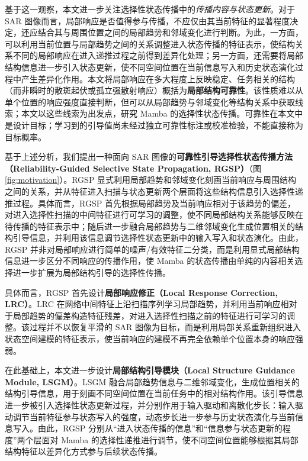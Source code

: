 \documentclass[journal]{IEEEtran}
\begin{document}
基于这一观察，本文进一步关注选择性状态传播中的\emph{传播内容与状态更新}。对于 SAR 图像而言，局部响应是否值得参与传播，不应仅由其当前特征的显著程度决定，还应结合其与周围位置之间的局部趋势和邻域变化进行判断。为此，一方面，可以利用当前位置与局部趋势之间的关系调整进入状态传播的特征表示，使结构关系不同的局部响应在进入递推过程之前得到差异化处理；另一方面，还需要将局部结构信息进一步引入状态更新，使不同空间位置在当前信息写入和历史状态演化过程中产生差异化作用。本文将局部响应在多大程度上反映稳定、任务相关的结构（而非瞬时的散斑起伏或孤立强散射响应）概括为\textbf{局部结构可靠性}。该性质难以从单个位置的响应强度直接判断，但可以从局部趋势与邻域变化等结构关系中获取线索；本文以这些线索为出发点，研究 Mamba 的选择性状态传播。可靠性在本文中是设计目标；学习到的引导值尚未经过独立可靠性标注或校准检验，不能直接称为目标概率。

基于上述分析，我们提出一种面向 SAR 图像的\textbf{可靠性引导选择性状态传播方法（Reliability-Guided Selective State Propagation, RGSP）}（图\ref{fig:motivation}）。RGSP 显式利用局部趋势和邻域变化刻画当前响应与周围结构之间的关系，并从特征进入扫描与状态更新两个层面将这些结构信息引入选择性递推过程。具体而言，RGSP 首先根据局部趋势及当前响应相对于该趋势的偏差，对进入选择性扫描的中间特征进行可学习的调整，使不同局部结构关系能够反映在待传播的特征表示中；随后进一步融合局部趋势与二维邻域变化生成位置相关的结构引导信息，并利用该信息调节选择性状态更新中的输入写入和状态演化。由此，RGSP 并非对局部响应进行简单的噪声/有效特征二分类，而是利用显式局部结构信息进一步区分不同响应的传播作用，使 Mamba 的状态传播由单纯的内容相关选择进一步扩展为局部结构引导的选择性传播。

具体而言，RGSP 首先设计\textbf{局部响应修正（Local Response Correction, LRC）}。LRC 在网络中间特征上沿扫描序列学习局部趋势，并利用当前响应相对于局部趋势的偏差构造特征残差，对进入选择性扫描之前的特征进行可学习的调整。该过程并不以恢复平滑的 SAR 图像为目标，而是利用局部关系重新组织进入状态空间建模的特征表示，使当前响应的建模不再完全依赖单个位置本身的响应强弱。

在此基础上，本文进一步设计\textbf{局部结构引导模块（Local Structure Guidance Module, LSGM）}。LSGM 融合局部趋势信息与二维邻域变化，生成位置相关的结构引导信息，用于刻画不同空间位置在当前任务中的相对结构作用。该引导信息进一步被引入选择性状态更新过程，并分别作用于输入驱动和离散化步长：输入驱动调节当前特征参与状态写入的强度，动态步长进一步参与历史状态演化与当前信息写入。由此，RGSP 分别从“进入状态传播的信息”和“信息参与状态更新的程度”两个层面对 Mamba 的选择性递推进行调节，使不同空间位置能够根据其局部结构特征以差异化方式参与后续状态传播。
\end{document}

